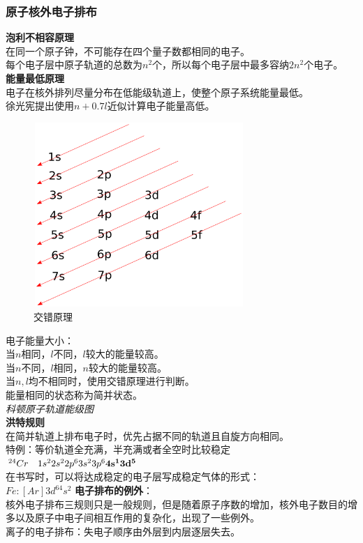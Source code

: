 \documentclass[utf8,a4paper,12pt]{ctexart}
\begin{document}
\subsubsection{原子核外电子排布}
{\bf 泡利不相容原理}\\
在同一个原子钟，不可能存在四个量子数都相同的电子。\\
每个电子层中原子轨道的总数为$n^2$个，所以每个电子层中最多容纳$2n^2$个电子。\\
{\bf 能量最低原理}\\
电子在核外排列尽量分布在低能级轨道上，使整个原子系统能量最低。\\
徐光宪提出使用$n+0.7l$近似计算电子能量高低。\\
\begin{figure}[H]
\centering
\includegraphics[width = 8cm, height = 7cm]{energy level diagram.png}
\caption{交错原理}
\end{figure}
电子能量大小：\\
当$n$相同，$l$不同，$l$较大的能量较高。\\
当$n$不同，$l$相同，$n$较大的能量较高。\\
当$n,l$均不相同时，使用交错原理进行判断。\\
能量相同的状态称为简并状态。\\
\emph{科顿原子轨道能级图}\\

{\bf 洪特规则}\\
在简并轨道上排布电子时，优先占据不同的轨道且自旋方向相同。\\
特例：等价轨道全充满，半充满或者全空时比较稳定\\
$^{24} Cr\quad 1s^2 2s^2 2p^6 3s^2 3p^6 {\bf 4s^1 3d^5}$\\
在书写时，可以将达成稳定的电子层写成稳定气体的形式：\\
$Fe:[Ar]3d^64s^2$
{\bf 电子排布的例外}：\\
核外电子排布三规则只是一般规则，但是随着原子序数的增加，核外电子数目的增多以及原子中电子间相互作用的复杂化，出现了一些例外。\\
离子的电子排布：失电子顺序由外层到内层逐层失去。
\end{document}
